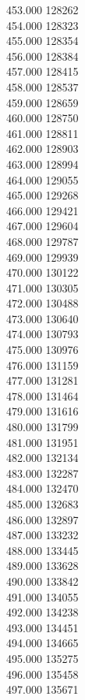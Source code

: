 { 453.000	128262 \\
 454.000	128323 \\
 455.000	128354 \\
 456.000	128384 \\
 457.000	128415 \\
 458.000	128537 \\
 459.000	128659 \\
 460.000	128750 \\
 461.000	128811 \\
 462.000	128903 \\
 463.000	128994 \\
 464.000	129055 \\
 465.000	129268 \\
 466.000	129421 \\
 467.000	129604 \\
 468.000	129787 \\
 469.000	129939 \\
 470.000	130122 \\
 471.000	130305 \\
 472.000	130488 \\
 473.000	130640 \\
 474.000	130793 \\
 475.000	130976 \\
 476.000	131159 \\
 477.000	131281 \\
 478.000	131464 \\
 479.000	131616 \\
 480.000	131799 \\
 481.000	131951 \\
 482.000	132134 \\
 483.000	132287 \\
 484.000	132470 \\
 485.000	132683 \\
 486.000	132897 \\
 487.000	133232 \\
 488.000	133445 \\
 489.000	133628 \\
 490.000	133842 \\
 491.000	134055 \\
 492.000	134238 \\
 493.000	134451 \\
 494.000	134665 \\
 495.000	135275 \\
 496.000	135458 \\
 497.000	135671 \\
}
